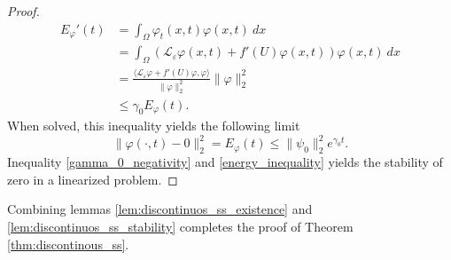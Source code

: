 \documentclass[12pt, a4paper]{article}
\theoremstyle{break}
\theoremstyle{break}
\theoremstyle{break}
\theoremstyle{break}
\theoremstyle{break}
\newcommand{\Leo}{\mathcal{L}_{\varepsilon}}
\begin{document}
\begin{proof}
    \begin{align*}
        E_\varphi'(t) &= \int_\Omega \varphi_t(x,t)\varphi(x,t)\:dx \\
        &= \int_\Omega \left(\Leo \varphi(x,t) + f'(U)\varphi(x,t)\right) \varphi(x,t)\:dx \\
        &= \frac{\langle \Leo \varphi + f'(U)\varphi, \varphi \rangle}{\|\varphi\|_2^2} \|\varphi\|_2^2 \\
        &\leq \gamma_0 E_\varphi(t).
    \end{align*}
    When solved, this inequality yields the following limit
    \begin{equation}
        \| \varphi(\cdot, t) - 0\|_2^2 =  E_\varphi(t) \leq \|\psi_0\|_2^2  e^{\gamma_0 t}.
        \label{energy_inequality}
    \end{equation}
    Inequality \eqref{gamma_0_negativity} and \eqref{energy_inequality} yields the stability of zero in a linearized problem.
\end{proof}
Combining lemmas \ref{lem:discontinuos_ss_existence} and \ref{lem:discontinuos_ss_stability} completes the proof of Theorem \ref{thm:discontinous_ss}.

% 
% 
\end{document}
